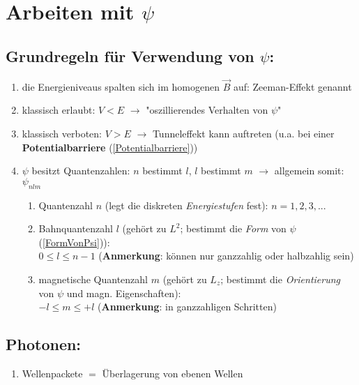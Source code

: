 \section{Arbeiten mit $\psi$}

\subsection{Grundregeln für Verwendung von $\psi$:}
\begin{enumerate}
    \item die Energieniveaus spalten sich im homogenen $\vec{B}$ auf: Zeeman-Effekt genannt
    \item klassisch erlaubt: $V<E$ $\rightarrow$ "oszillierendes Verhalten von $\psi$"
    \item klassisch verboten: $V>E$ $\rightarrow$ Tunneleffekt kann auftreten (u.a. bei einer \textbf{Potentialbarriere} (\ref{Potentialbarriere}))
    \item $\psi$ besitzt Quantenzahlen: $n$ bestimmt $l$, $l$ bestimmt $m$ $\rightarrow$ allgemein somit: $\psi_{nlm}$
    \begin{enumerate}
        \item Quantenzahl $n$ (legt die diskreten \textit{Energiestufen} fest): $n=1,2,3,...$
        \item Bahnquantenzahl $l$ (gehört zu $L^2$; bestimmt die \textit{Form} von $\psi$ (\ref{FormVonPsi})):\\
        $0\leq l\leq n-1$ (\textbf{Anmerkung}: können nur ganzzahlig oder halbzahlig sein)
        \item magnetische Quantenzahl $m$ (gehört zu $L_z$; bestimmt die \textit{Orientierung} von $\psi$ und magn. Eigenschaften):\\
        $-l\leq m \leq +l$ (\textbf{Anmerkung}: in ganzzahligen Schritten)
    \end{enumerate}
\end{enumerate}

\subsection{Photonen:}
\begin{enumerate}
    \item Wellenpackete $=$ Überlagerung von ebenen Wellen
\end{enumerate}

